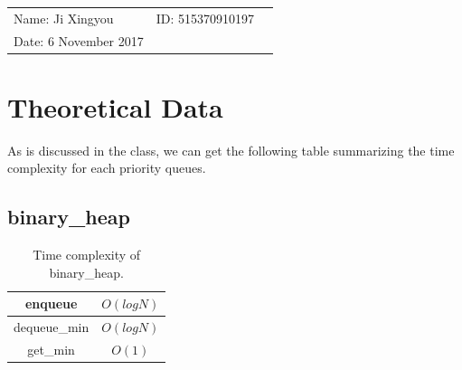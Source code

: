 \documentclass{article}
\begin{document}
\begin{spacing}{2.0}
\vspace*{0.25cm}

\hrulefill

\thispagestyle{empty}

\begin{center}
\begin{large}
\end{large}

\hrulefill

\vspace*{5cm}
\begin{Large}
\end{Large}

\vspace{2em}

\end{center}


\vfill

\begin{table}[h!]
\flushleft
\begin{tabular}{lll}
Name: Ji Xingyou \hspace*{2em}&
ID: 515370910197\hspace*{2em}
\\

Date: 6 November 2017

\end{tabular}
\end{table}

\hfill

\newpage
\tableofcontents
\newpage
\section{Theoretical Data}
\indent As is discussed in the class, we can get the following table summarizing the time complexity for each priority queues.
\subsection{binary\_heap}
\begin{table}[!hbp]
\centering
\begin{tabular}{c|c}
enqueue&$O(logN)$\\
\hline
dequeue\_min&$O(logN)$\\
\hline
get\_min&$O(1)$\\
\end{tabular}
\caption{Time complexity of binary\_heap.}
\end{table}

\end{spacing}
\end{document}

